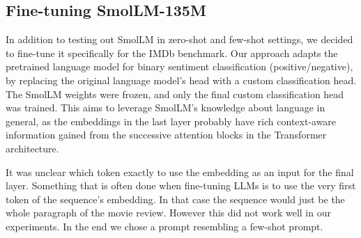 \documentclass[10pt,twocolumn,letterpaper]{article}
\begin{document}
\begin{table}
\begin{center}
\end{center}
\caption{Few-shot prompts used to test default SmolLM models.}
\label{tab:few-shot-prompts}
\end{table}




\subsection{Fine-tuning SmolLM-135M}
\label{sec:ft_setup}

In addition to testing out SmolLM in zero-shot and few-shot settings, we decided to fine-tune it specifically for the IMDb benchmark. Our approach adapts the pretrained language model for binary sentiment classification (positive/negative), by replacing the original language model's head with a custom classification head. The SmolLM weights were frozen, and only the final custom classification head was trained.
This aims to leverage SmolLM's knowledge about language in general, as the embeddings in the last layer probably have rich context-aware information gained from the successive attention blocks in the Transformer architecture.

It was unclear which token exactly to use the embedding as an input for the final layer. Something that is often done when fine-tuning LLMs is to use the very first token of the sequence's embedding. In that case the sequence would just be the whole paragraph of the movie review. However this did not work well in our experiments.
In the end we chose a prompt resembling a few-shot prompt.
\end{document}
